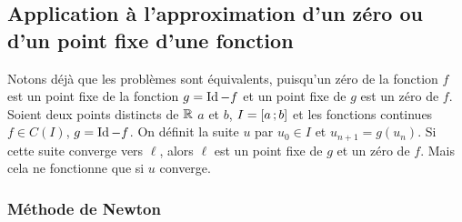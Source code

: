 \subsection{Application à l'approximation d'un zéro ou d'un point fixe d'une
fonction}

Notons déjà que les problèmes sont équivalents, puisqu'un zéro de la fonction
\(f\) est un point fixe de la fonction \(g=\operatorname{Id}-f\) et un point fixe de \(g\) est
un zéro de \(f\). Soient deux points distincts de \(\mathbb{R}\) \(a\) et \(b\),
\(I=\left[ a \, ; {} b \right]\) et les fonctions continues \(f \in \mathit{C}(I)\),
\(g=\operatorname{Id} - f\). On définit la suite \(u\) par \(u_0 \in I\) et
\(u_{n+1}=g(u_n)\). Si cette suite converge vers \(\ell\), alors \(\ell\) est un
point fixe de \(g\) et un zéro de \(f\). Mais cela ne fonctionne que si \(u\)
converge.

\subsubsection{Méthode de Newton}

